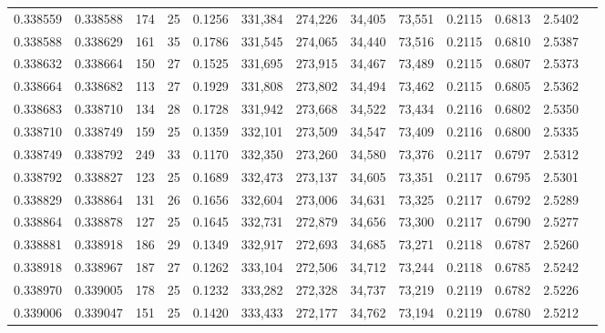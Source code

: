 \begin{tabular}{rrrrrrrrrrrrr}
0.338559 & 0.338588 &   174 &  25 &                                     0.1256 & 331,384 & 274,226 &  34,405 &  73,551 & 0.2115 & 0.6813 & 2.5402 \\
0.338588 & 0.338629 &   161 &  35 &                                     0.1786 & 331,545 & 274,065 &  34,440 &  73,516 & 0.2115 & 0.6810 & 2.5387 \\
0.338632 & 0.338664 &   150 &  27 &                                     0.1525 & 331,695 & 273,915 &  34,467 &  73,489 & 0.2115 & 0.6807 & 2.5373 \\
0.338664 & 0.338682 &   113 &  27 &                                     0.1929 & 331,808 & 273,802 &  34,494 &  73,462 & 0.2115 & 0.6805 & 2.5362 \\
0.338683 & 0.338710 &   134 &  28 &                                     0.1728 & 331,942 & 273,668 &  34,522 &  73,434 & 0.2116 & 0.6802 & 2.5350 \\
0.338710 & 0.338749 &   159 &  25 &                                     0.1359 & 332,101 & 273,509 &  34,547 &  73,409 & 0.2116 & 0.6800 & 2.5335 \\
0.338749 & 0.338792 &   249 &  33 &                                     0.1170 & 332,350 & 273,260 &  34,580 &  73,376 & 0.2117 & 0.6797 & 2.5312 \\
0.338792 & 0.338827 &   123 &  25 &                                     0.1689 & 332,473 & 273,137 &  34,605 &  73,351 & 0.2117 & 0.6795 & 2.5301 \\
0.338829 & 0.338864 &   131 &  26 &                                     0.1656 & 332,604 & 273,006 &  34,631 &  73,325 & 0.2117 & 0.6792 & 2.5289 \\
0.338864 & 0.338878 &   127 &  25 &                                     0.1645 & 332,731 & 272,879 &  34,656 &  73,300 & 0.2117 & 0.6790 & 2.5277 \\
0.338881 & 0.338918 &   186 &  29 &                                     0.1349 & 332,917 & 272,693 &  34,685 &  73,271 & 0.2118 & 0.6787 & 2.5260 \\
0.338918 & 0.338967 &   187 &  27 &                                     0.1262 & 333,104 & 272,506 &  34,712 &  73,244 & 0.2118 & 0.6785 & 2.5242 \\
0.338970 & 0.339005 &   178 &  25 &                                     0.1232 & 333,282 & 272,328 &  34,737 &  73,219 & 0.2119 & 0.6782 & 2.5226 \\
0.339006 & 0.339047 &   151 &  25 &                                     0.1420 & 333,433 & 272,177 &  34,762 &  73,194 & 0.2119 & 0.6780 & 2.5212 \\

\end{tabular}
